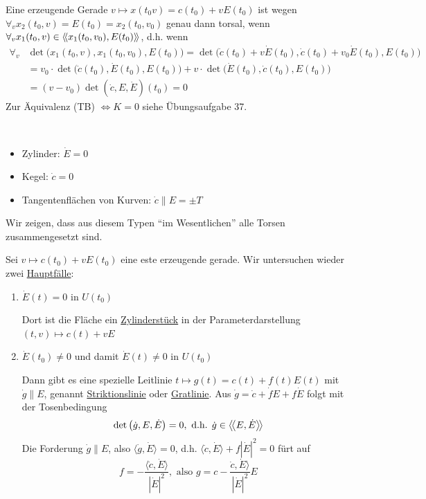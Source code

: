 \begin{beweis}
 Eine erzeugende Gerade \(v \mapsto x(t_0 v) = c(t_0) + v E(t_0)\) ist wegen \(\forall_v x_2(t_0, v) = E(t_0) = x_2(t_0, v_0)\) genau dann torsal, wenn \(\forall_v x_1(t_0, v) \in \left\langle\!\left\langle x_1(t_0, v_0), E(t_0) \right\rangle\!\right\rangle\), d.h. wenn 
 \begin{align*}
  \forall_v &\det\big(x_1(t_0, v), x_1(t_0, v_0), E(t_0)\big) = \det \big(\dot c(t_0) + v \dot E(t_0), \dot c(t_0) + v_0 \dot E(t_0), E(t_0)\big) \\
  &= v_0 \cdot \det \big(\dot c(t_0), \dot E(t_0), E(t_0)\big) + v \cdot \det \big(\dot E(t_0), \dot c(t_0), E(t_0)\big) \\
  &= (v - v_0) \det \left(\dot c, E, \dot E\right) (t_0) = 0
 \end{align*}
 Zur Äquivalenz (TB) \(\Leftrightarrow K = 0\) siehe Übungsaufgabe 37.
\end{beweis}

\begin{bsp} \(\)
 \begin{itemize}
  \item Zylinder: \(\dot E = 0\)
  \item Kegel: \(\dot c = 0\)
  \item Tangentenflächen von Kurven: \(\dot c \parallel E = \pm T\)
 \end{itemize}
\end{bsp}

Wir zeigen, dass aus diesem Typen "`im Wesentlichen"' alle Torsen zusammengesetzt sind. \par
Sei \(v \mapsto c(t_0) + v E(t_0)\) eine este erzeugende gerade. Wir untersuchen wieder zwei \uline{Hauptfälle}:
\begin{enumerate}
 \item[{\color{green}(A)}] \(\dot E(t) = 0\) in \(U(t_0)\) \par
 Dort ist die Fläche ein \uline{Zylinderstück} in der Parameterdarstellung \((t,v) \mapsto c(t) + v E\)
 \item[{\color{green}(B)}] \(\dot E(t_0) \ne 0\) und damit \(\dot E(t) \ne 0\) in \(U(t_0)\) \par
 Dann gibt es eine spezielle Leitlinie \(t \mapsto g(t) = c(t) + f(t) E(t)\) mit \(\dot g \parallel E\), genannt \uline{Striktionslinie} oder \uline{Gratlinie}. Aus \(\dot g = \dot c + \dot f E + f \dot E\) folgt mit der Tosenbedingung
 \[
  \det \left(\dot g, E, \dot E\right) = 0, \text{ d.h. } \dot g \in \left\langle\!\left\langle E, \dot E\right\rangle\!\right\rangle
 \]
 Die Forderung \(\dot g \parallel E\), also \(\langle \dot g, \dot E\rangle = 0\), d.h. \(\langle \dot c, \dot E\rangle + f \left| \dot E \right|^2 = 0\) fürt auf
 \[
  f = - \frac{\langle \dot c, \dot E\rangle}{\left|\dot E\right|^2}, \text{ also } g = c - \frac{\dot c, \dot E\rangle}{\left|\dot E\right|^2}E
 \]
\end{enumerate}

